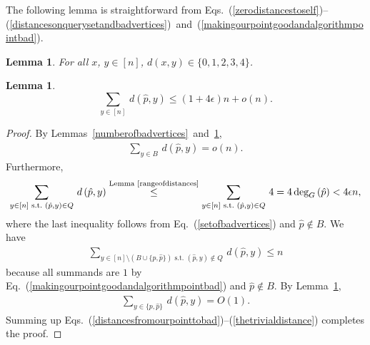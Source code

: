 \documentclass[letterpaper,12pt]{article}
\newtheorem{lemma}[theorem]{Lemma}
\begin{document}
{The following lemma is straightforward from
Eqs.~(\ref{zerodistancestoself})--(\ref{distancesonquerysetandbadvertices})~and~(\ref{makingourpointgoodandalgorithmpointbad}).

\begin{lemma}\label{rangeofdistances}
For all $x$, $y\in[n]$, $d(x,y)\in\{0,1,2,3,4\}$.
\end{lemma}


\begin{lemma}\label{speciallydesignedpointisgood}
$$\sum_{y\in[n]}\,d\left(\hat{p},y\right)\le \left(1+4\epsilon\right)n+o(n).$$
\end{lemma}
\begin{proof}
By Lemmas~\ref{numberofbadvertices}~and~\ref{rangeofdistances},
\begin{eqnarray}
\sum_{y\in B}\,d\left(\hat{p},y\right)=o(n).
\label{distancesfromourpointtobad}
\end{eqnarray}
Furthermore,
\begin{eqnarray}
\sum_{y\in[n]\text{ s.t.\ }(\hat{p},y)\in Q}\,d\left(\hat{p},y\right)
\stackrel{\text{Lemma~\ref{rangeofdistances}}}{\le} \sum_{y\in[n]\text{ s.t.\ }(\hat{p},y)\in Q}\,4
= 4\,\text{deg}_G\left(\hat{p}\right)<4\epsilon n,
\label{distancesfromoutpointtoqueried}
\end{eqnarray}
where the last inequality follows from Eq.~(\ref{setofbadvertices})
and $\hat{p}\notin B$.
We have
\begin{eqnarray}
\sum_{y\in[n]\setminus(B\cup\{p,\hat{p}\})\text{ s.t.\ }
(\hat{p},y)\notin Q}\,d\left(\hat{p},y\right)
\le n
\label{distancesfromourpointtononbadnonqueried}
\end{eqnarray}
because all summands are $1$ by
Eq.~(\ref{makingourpointgoodandalgorithmpointbad}) and $\hat{p}\notin B$.
By Lemma~\ref{rangeofdistances},
\begin{eqnarray}
\sum_{y\in\{p,\hat{p}\}}\,d\left(\hat{p},y\right)=O(1).
\label{thetrivialdistance}
\end{eqnarray}
Summing up
Eqs.~(\ref{distancesfromourpointtobad})--(\ref{thetrivialdistance})
completes the proof.
\end{proof}

}
\end{document}

